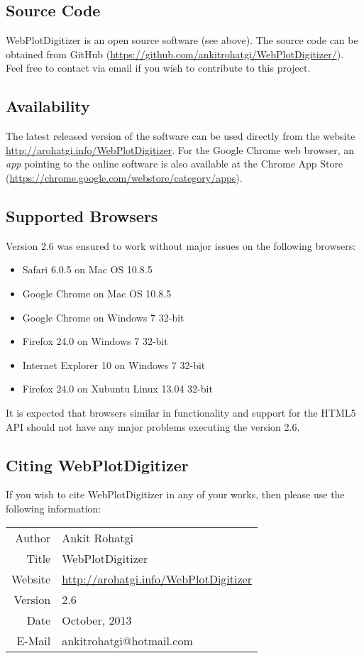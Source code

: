 \documentclass[letterpaper, 10pt]{article}
\begin{document}
\subsection{Source Code}
WebPlotDigitizer is an open source software (see above). The source code can be obtained from GitHub (\url{https://github.com/ankitrohatgi/WebPlotDigitizer/}). Feel free to contact via email if you wish to contribute to this project.

\subsection{Availability}
The latest released version of the software can be used directly from the website \url{http://arohatgi.info/WebPlotDigitizer}. For the Google Chrome web browser, an \emph{app} pointing to the online software is also available at the Chrome App Store (\url{https://chrome.google.com/webstore/category/apps}).

\subsection{Supported Browsers}
Version 2.6 was ensured to work without major issues on the following browsers:
\begin{itemize}
\item{Safari 6.0.5 on Mac OS 10.8.5}
\item{Google Chrome on Mac OS 10.8.5}
\item{Google Chrome on Windows 7 32-bit}
\item{Firefox 24.0 on Windows 7 32-bit}
\item{Internet Explorer 10 on Windows 7 32-bit}
\item{Firefox 24.0 on Xubuntu Linux 13.04 32-bit}
\end{itemize}
It is expected that browsers similar in functionality and support for the HTML5 API should not have any major problems executing the version 2.6.

\subsection{Citing WebPlotDigitizer}
If you wish to cite WebPlotDigitizer in any of your works, then please use the following information:

\begin{center}
\begin{tabular}{|r|l|}
\hline
Author & Ankit Rohatgi\\
Title & WebPlotDigitizer\\
Website & \url{http://arohatgi.info/WebPlotDigitizer}\\
Version & 2.6\\
Date & October, 2013\\
E-Mail & ankitrohatgi@hotmail.com\\
\hline
\end{tabular}
\end{center}
\end{document}
